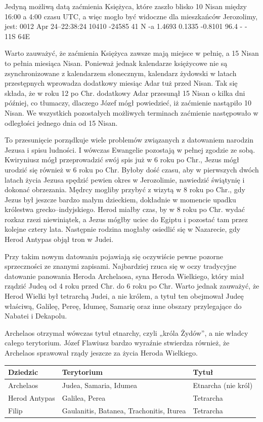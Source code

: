 Jedyną możliwą datą zaćmienia Księżyca, które zaszło blisko 10 Nisan między 16:00 a 4:00 czasu UTC, a więc mogło być widoczne dla mieszkańców Jerozolimy, jest: 0012 Apr 24--22:38:24 10410 -24585 41 N -a 1.4693 0.1335 -0.8101 96.4 - - 11S 64E

Warto zauważyć, że zaćmienia Księżyca zawsze mają miejsce w pełnię, a 15 Nisan to pełnia miesiąca Nisan.
Ponieważ jednak kalendarze księżycowe nie są zsynchronizowane z kalendarzem słonecznym, kalendarz żydowski w latach przestępnych wprowadza dodatkowy miesiąc Adar tuż przed Nisan.
Tak się składa, że w roku 12 po Chr. dodatkowy Adar przesunął 15 Nisan o kilka dni później, co tłumaczy, dlaczego Józef mógł powiedzieć, iż zaćmienie nastąpiło 10 Nisan.
We wszystkich pozostałych możliwych terminach zaćmienie następowało w odległości jednego dnia od 15 Nisan.

To przesunięcie porządkuje wiele problemów związanych z datowaniem narodzin Jezusa i spisu ludności.
I wówczas Ewangelie pozostają w pełnej zgodzie ze sobą.
Kwiryniusz mógł przeprowadzić swój spis już w 6 roku po Chr., Jezus mógł urodzić się również w 6 roku po Chr.
Byłoby dość czasu, aby w pierwszych dwóch latach życia Jezusa spędzić pewien okres w Jerozolimie, nawiedzić świątynię i dokonać obrzezania.
Mędrcy mogliby przybyć z wizytą w 8 roku po Chr., gdy Jezus był jeszcze bardzo małym dzieckiem, dokładnie w momencie upadku królestwa grecko–indyjskiego.
Herod miałby czas, by w 8 roku po Chr. wydać rozkaz rzezi niewiniątek, a Jezus mógłby uciec do Egiptu i pozostać tam przez kolejne cztery lata.
Następnie rodzina mogłaby osiedlić się w Nazarecie, gdy Herod Antypas objął tron w Judei.

Przy takim nowym datowaniu pojawiają się oczywiście pewne pozorne sprzeczności ze znanymi zapisami.
Najbardziej rzuca się w oczy tradycyjne datowanie panowania Heroda Archelaosa, syna Heroda Wielkiego, który miał rządzić Judeą od 4 roku przed Chr. do 6 roku po Chr.
Warto jednak zauważyć, że Herod Wielki był tetrarchą Judei, a nie królem, a tytuł ten obejmował Judeę właściwą, Galileę, Pereę, Idumeę, Samarię oraz inne obszary przylegające do Nabatei i Dekapolu.

Archelaos otrzymał wówczas tytuł etnarchy, czyli „króla Żydów”, a nie władcy całego terytorium.
Józef Flawiusz bardzo wyraźnie stwierdza również, że Archelaos sprawował rządy jeszcze za życia Heroda Wielkiego.

\begin{center}
\begin{tabular}{@{}lll@{}}
\toprule
\textbf{Dziedzic} & \textbf{Terytorium} & \textbf{Tytuł} \\
\midrule
Archelaos & Judea, Samaria, Idumea & Etnarcha (nie król) \\
Herod Antypas & Galilea, Perea & Tetrarcha \\
Filip & Gaulanitis, Batanea, Trachonitis, Iturea & Tetrarcha \\
\bottomrule
\end{tabular}
\end{center}

